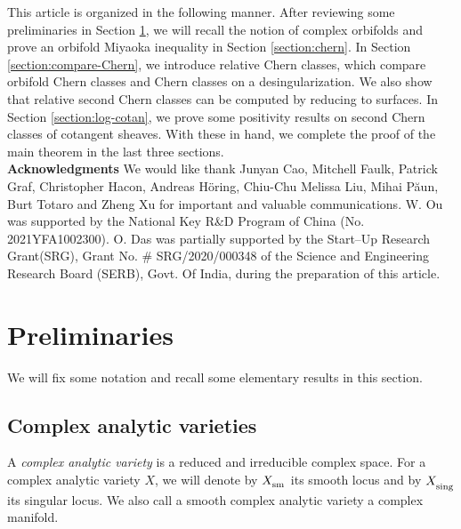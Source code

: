 \documentclass[12pt]{amsart}
\newcommand{\mbZ}{\mathbb{Z}}
\newcommand{\<}{\leq}
\theoremstyle{remark}
\theoremstyle{definition}
\theoremstyle{definition}
\numberwithin{equation}{section}
\theoremstyle{definition}
\theoremstyle{definition}
\def\sm{\operatorname{\textsubscript{\rm sm}}}
\def\sing{\operatorname{\textsubscript{\rm sing}}}
\begin{document}

This article is organized in the following manner. 
After reviewing some preliminaries in Section \ref{section:pre}, we will recall the notion of complex orbifolds and prove an orbifold Miyaoka inequality in   Section \ref{section:chern}.  
In Section \ref{section:compare-Chern}, we introduce relative Chern classes, which
compare orbifold Chern classes and Chern classes on a desingularization. 
We also show that relative second Chern classes can be computed by reducing to surfaces. 
In Section  \ref{section:log-cotan}, we prove some positivity results on second Chern classes of cotangent sheaves. 
With these in hand, we complete the proof of the main theorem in the last three sections. \\

{\bf Acknowledgments} We would like thank 
Junyan Cao, 
Mitchell Faulk, 
Patrick Graf, 
Christopher Hacon,
Andreas H\"oring, 
Chiu-Chu Melissa Liu, 
Mihai P\u{a}un,  
Burt Totaro 
and Zheng Xu 
for important and valuable communications. 
W. Ou was supported by the National Key R\&D Program of China (No. 2021YFA1002300). 
O. Das was partially supported by the Start--Up Research Grant(SRG), Grant No. \# SRG/2020/000348 of the Science and Engineering Research Board (SERB), Govt. Of India, during the preparation of this article.

\section{Preliminaries} 
\label{section:pre}

We will fix some notation and recall some elementary results in this section.  

\subsection{Complex analytic varieties}

A \emph{complex analytic variety} 
is a reduced and irreducible  complex space. 
For a complex analytic variety $X$, we will denote by $X_{\sm}$ its smooth locus and by $X_{\sing}$ its singular locus. 
We also call a  smooth complex analytic variety a complex manifold.
\end{document}
